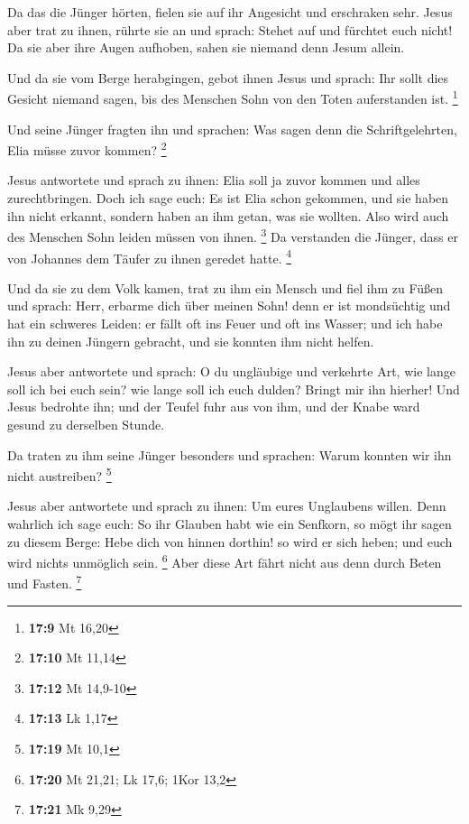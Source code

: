  Da das die Jünger hörten, fielen sie auf ihr Angesicht und
erschraken sehr.  Jesus aber trat zu ihnen, rührte sie an
und sprach: Stehet auf und fürchtet euch nicht!  Da sie aber
ihre Augen aufhoben, sahen sie niemand denn Jesum allein.

 Und da sie vom Berge herabgingen, gebot ihnen Jesus und
sprach: Ihr sollt dies Gesicht niemand sagen, bis des Menschen Sohn von
den Toten auferstanden ist. \footnote{\textbf{17:9} Mt 16,20}

 Und seine Jünger fragten ihn und sprachen: Was sagen denn
die Schriftgelehrten, Elia müsse zuvor kommen? \footnote{\textbf{17:10}
  Mt 11,14}

 Jesus antwortete und sprach zu ihnen: Elia soll ja zuvor
kommen und alles zurechtbringen.  Doch ich sage euch: Es
ist Elia schon gekommen, und sie haben ihn nicht erkannt, sondern haben
an ihm getan, was sie wollten. Also wird auch des Menschen Sohn leiden
müssen von ihnen. \footnote{\textbf{17:12} Mt 14,9-10}  Da
verstanden die Jünger, dass er von Johannes dem Täufer zu ihnen geredet
hatte. \footnote{\textbf{17:13} Lk 1,17}

 Und da sie zu dem Volk kamen, trat zu ihm ein Mensch und
fiel ihm zu Füßen  und sprach: Herr, erbarme dich über
meinen Sohn! denn er ist mondsüchtig und hat ein schweres Leiden: er
fällt oft ins Feuer und oft ins Wasser;  und ich habe ihn
zu deinen Jüngern gebracht, und sie konnten ihm nicht helfen.

 Jesus aber antwortete und sprach: O du ungläubige und
verkehrte Art, wie lange soll ich bei euch sein? wie lange soll ich euch
dulden? Bringt mir ihn hierher!  Und Jesus bedrohte ihn;
und der Teufel fuhr aus von ihm, und der Knabe ward gesund zu derselben
Stunde.

 Da traten zu ihm seine Jünger besonders und sprachen:
Warum konnten wir ihn nicht austreiben? \footnote{\textbf{17:19} Mt 10,1}

 Jesus aber antwortete und sprach zu ihnen: Um eures
Unglaubens willen. Denn wahrlich ich sage euch: So ihr Glauben habt wie
ein Senfkorn, so mögt ihr sagen zu diesem Berge: Hebe dich von hinnen
dorthin! so wird er sich heben; und euch wird nichts unmöglich sein.
\footnote{\textbf{17:20} Mt 21,21; Lk 17,6; 1Kor 13,2} 
Aber diese Art fährt nicht aus denn durch Beten und Fasten. \footnote{\textbf{17:21}
  Mk 9,29}

